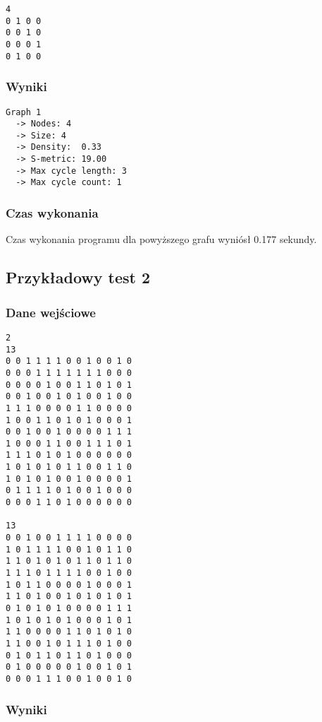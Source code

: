 \documentclass[a4paper, 12pt]{article}
\begin{document}
\begin{verbatim}
4
0 1 0 0
0 0 1 0
0 0 0 1
0 1 0 0
\end{verbatim}

\subsubsection*{Wyniki}

\begin{verbatim}
Graph 1
  -> Nodes: 4
  -> Size: 4
  -> Density:  0.33
  -> S-metric: 19.00
  -> Max cycle length: 3
  -> Max cycle count: 1
\end{verbatim}

\subsubsection*{Czas wykonania}

Czas wykonania programu dla powyższego grafu wyniósł 0.177 sekundy.

\subsection{Przykładowy test 2}

\subsubsection*{Dane wejściowe}

\begin{verbatim}
2
13
0 0 1 1 1 1 0 0 1 0 0 1 0
0 0 0 1 1 1 1 1 1 1 0 0 0
0 0 0 0 1 0 0 1 1 0 1 0 1
0 0 1 0 0 1 0 1 0 0 1 0 0
1 1 1 0 0 0 0 1 1 0 0 0 0
1 0 0 1 1 0 1 0 1 0 0 0 1
0 0 1 0 0 1 0 0 0 0 1 1 1
1 0 0 0 1 1 0 0 1 1 1 0 1
1 1 1 0 1 0 1 0 0 0 0 0 0
1 0 1 0 1 0 1 1 0 0 1 1 0
1 0 1 0 1 0 0 1 0 0 0 0 1
0 1 1 1 1 0 1 0 0 1 0 0 0
0 0 0 1 1 0 1 0 0 0 0 0 0

13
0 0 1 0 0 1 1 1 1 0 0 0 0
1 0 1 1 1 1 0 0 1 0 1 1 0
1 1 0 1 0 1 0 1 1 0 1 1 0
1 1 1 0 1 1 1 1 0 0 1 0 0
1 0 1 1 0 0 0 0 1 0 0 0 1
1 1 0 1 0 0 1 0 1 0 1 0 1
0 1 0 1 0 1 0 0 0 0 1 1 1
1 0 1 0 1 0 1 0 0 0 1 0 1
1 1 0 0 0 0 1 1 0 1 0 1 0
1 1 0 0 1 0 1 1 1 0 1 0 0
0 1 0 1 1 0 1 1 0 1 0 0 0
0 1 0 0 0 0 0 1 0 0 1 0 1
0 0 0 1 1 1 0 0 1 0 0 1 0
\end{verbatim}

\subsubsection*{Wyniki}
\end{document}
